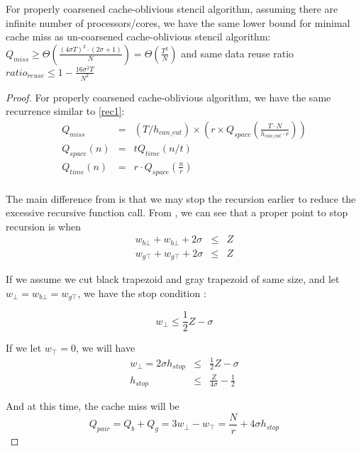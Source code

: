 \begin{theorem}
For properly coarsened cache-oblivious stencil algorithm, assuming there are infinite number of processors/cores,
we have the same lower bound for minimal
cache miss as un-coarsened cache-oblivious stencil algorithm: 
$Q_{miss} \geq \Theta (\frac{(4 \sigma T)^2 \cdot (2 \sigma + 1)}{N}) = \Theta (\frac{T^2}{N})$
and same data reuse ratio 
$ratio_{reuse} \leq 1 - \frac{16 \sigma^2 T}{N^2}$
\label{thm:coCoarsened}
\end{theorem}
\begin{proof}
For properly coarsened cache-oblivious algorithm, we have the same recurrence similar to \eqref{rec1}:
\begin{eqnarray}
Q_{miss} & = & (T/h_{can\_cut}) \times (r \times Q_{space}(\frac{T \cdot N}{h_{can\_cut} \cdot r})) \\
Q_{space}(n) & = & t Q_{time}(n/t) \\
Q_{time}(n) & = & r \cdot Q_{space}(\frac{n}{r}) \\
\end{eqnarray}

The main difference from  is that we may stop the recursion earlier to reduce the
excessive recursive function call. From , we can see that a proper
point to stop recursion is when 
\begin{eqnarray}
w_{b\bot} + w_{b\bot} + 2 \sigma & \leq & Z \\
w_{g\top} + w_{g\top} + 2 \sigma & \leq & Z
\end{eqnarray}

If we assume we cut black trapezoid and gray trapezoid of same size, and let $w_{\bot} = w_{b\bot} = w_{g\top}$, 
we have the stop condition :

\begin{equation}
w_{\bot} \leq \frac{1}{2} Z - \sigma
\end{equation}

If we let $w_{\top} = 0$, we will have
\begin{eqnarray}
w_{\bot} = 2 \sigma h_{stop} & \leq & \frac{1}{2} Z - \sigma \\
h_{stop} & \leq & \frac{Z}{4 \sigma} - \frac{1}{2}
\end{eqnarray}

And at this time, the cache miss will be
\begin{equation}
Q_{pair} = Q_b + Q_g = 3 w_{\bot} - w_{\top} = \frac{N}{r} + 4 \sigma h_{stop} \label{eq:rec2}
\end{equation}


\end{proof}
